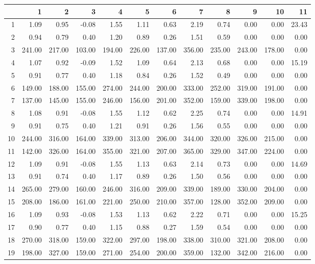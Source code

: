 \begin{table}[ht]
\centering
\begin{tabular}{rrrrrrrrrrrr}
  \hline
 & 1 & 2 & 3 & 4 & 5 & 6 & 7 & 8 & 9 & 10 & 11 \\ 
  \hline
1 & 1.09 & 0.95 & -0.08 & 1.55 & 1.11 & 0.63 & 2.19 & 0.74 & 0.00 & 0.00 & 23.43 \\ 
  2 & 0.94 & 0.79 & 0.40 & 1.20 & 0.89 & 0.26 & 1.51 & 0.59 & 0.00 & 0.00 & 0.00 \\ 
  3 & 241.00 & 217.00 & 103.00 & 194.00 & 226.00 & 137.00 & 356.00 & 235.00 & 243.00 & 178.00 & 0.00 \\ 
  4 & 1.07 & 0.92 & -0.09 & 1.52 & 1.09 & 0.64 & 2.13 & 0.68 & 0.00 & 0.00 & 15.19 \\ 
  5 & 0.91 & 0.77 & 0.40 & 1.18 & 0.84 & 0.26 & 1.52 & 0.49 & 0.00 & 0.00 & 0.00 \\ 
  6 & 149.00 & 188.00 & 155.00 & 274.00 & 244.00 & 200.00 & 333.00 & 252.00 & 319.00 & 191.00 & 0.00 \\ 
  7 & 137.00 & 145.00 & 155.00 & 246.00 & 156.00 & 201.00 & 352.00 & 159.00 & 339.00 & 198.00 & 0.00 \\ 
  8 & 1.08 & 0.91 & -0.08 & 1.55 & 1.12 & 0.62 & 2.25 & 0.74 & 0.00 & 0.00 & 14.91 \\ 
  9 & 0.91 & 0.75 & 0.40 & 1.21 & 0.91 & 0.26 & 1.56 & 0.55 & 0.00 & 0.00 & 0.00 \\ 
  10 & 244.00 & 316.00 & 164.00 & 339.00 & 313.00 & 206.00 & 344.00 & 320.00 & 326.00 & 215.00 & 0.00 \\ 
  11 & 142.00 & 326.00 & 164.00 & 355.00 & 321.00 & 207.00 & 365.00 & 329.00 & 347.00 & 224.00 & 0.00 \\ 
  12 & 1.09 & 0.91 & -0.08 & 1.55 & 1.13 & 0.63 & 2.14 & 0.73 & 0.00 & 0.00 & 14.69 \\ 
  13 & 0.91 & 0.74 & 0.40 & 1.17 & 0.89 & 0.26 & 1.50 & 0.56 & 0.00 & 0.00 & 0.00 \\ 
  14 & 265.00 & 279.00 & 160.00 & 246.00 & 316.00 & 209.00 & 339.00 & 189.00 & 330.00 & 204.00 & 0.00 \\ 
  15 & 208.00 & 186.00 & 161.00 & 221.00 & 250.00 & 210.00 & 357.00 & 128.00 & 352.00 & 209.00 & 0.00 \\ 
  16 & 1.09 & 0.93 & -0.08 & 1.53 & 1.13 & 0.62 & 2.22 & 0.71 & 0.00 & 0.00 & 15.25 \\ 
  17 & 0.90 & 0.77 & 0.40 & 1.15 & 0.88 & 0.27 & 1.59 & 0.54 & 0.00 & 0.00 & 0.00 \\ 
  18 & 270.00 & 318.00 & 159.00 & 322.00 & 297.00 & 198.00 & 338.00 & 310.00 & 321.00 & 208.00 & 0.00 \\ 
  19 & 198.00 & 327.00 & 159.00 & 271.00 & 254.00 & 200.00 & 359.00 & 132.00 & 342.00 & 216.00 & 0.00 \\ 
   \hline
\end{tabular}
\end{table}

